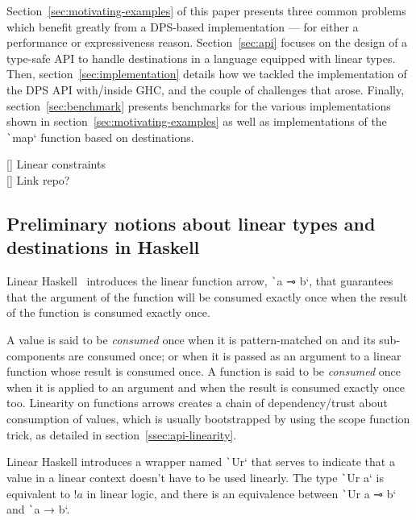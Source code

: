 \documentclass[english]{jflart}
\newcommand{\TODO}[1]{{\color{red}\large #1}}
\begin{document}
Section~\ref{sec:motivating-examples} of this paper presents three common problems which benefit greatly from a DPS-based implementation --- for either a performance or expressiveness reason. Section~\ref{sec:api} focuses on the design of a type-safe API to handle destinations in a language equipped with linear types. Then, section~\ref{sec:implementation} details how we tackled the implementation of the DPS API with/inside GHC, and the couple of challenges that arose. Finally, section~\ref{sec:benchmark} presents benchmarks for the various implementations shown in section~\ref{sec:motivating-examples} as well as implementations of the \texttt`map` function based on destinations.

\TODO{[] Linear constraints}\\
\TODO{[] Link repo?}\\

\subsection{Preliminary notions about linear types and destinations in Haskell}\label{ssec:intro-linearity}

Linear Haskell~\cite{bernardy_linear_2018} introduces the linear function arrow, \texttt`a ⊸ b`, that guarantees that the argument of the function will be consumed exactly once when the result of the function is consumed exactly once.

A value is said to be \emph{consumed} once when it is pattern-matched on and its sub-components are consumed once; or when it is passed as an argument to a linear function whose result is consumed once. A function is said to be \emph{consumed} once when it is applied to an argument and when the result is consumed exactly once too. Linearity on functions arrows creates a chain of dependency/trust about consumption of values, which is usually bootstrapped by using the scope function trick, as detailed in section~\ref{ssec:api-linearity}.

Linear Haskell introduces a wrapper named \texttt`Ur` that serves to indicate that a value in a linear context doesn't have to be used linearly. The type \texttt`Ur a` is equivalent to $!a$ in linear logic, and there is an equivalence between \texttt`Ur a ⊸ b` and \texttt`a → b`.
\end{document}

